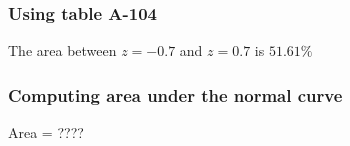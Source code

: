 \documentclass[handout]{beamer}
\begin{document}
   \begin{frame}
   \frametitle{Using table A-104}
   \begin{center}
   \end{center}
   The area between $z=-0.7$ and $z=0.7$ is $51.61\%$
   \end{frame}



   \begin{frame}
   \frametitle{Computing area under the normal curve}
   \begin{center}
   \end{center}
   Area = ????
   \end{frame}

\end{document}
